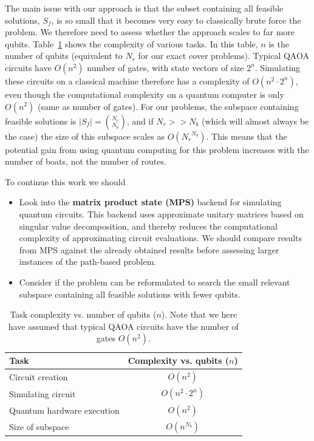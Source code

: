 \documentclass{article}
\begin{document}
The main issue with our approach is that the subset containing all feasible solutions, $S_f$, is so small that it becomes very easy to classically brute force the problem. We therefore need to assess whether the approach scales to far more qubits. 
Table~\ref{tab:task_complexity} shows the complexity of various tasks.
In this table, $n$ is the number of qubits (equivalent to $N_r$ for our exact cover problems). Typical QAOA circuits have $O(n^2)$ number of gates, with state vectors of size $2^n$. Simulating these circuits on a classical machine therefore has a complexity of $O(n^2 \cdot 2^n)$, even though the computational complexity on a quantum computer is only $O(n^2)$ (same as number of gates). For our problems, the subspace containing feasible solutions is $|S_f| = \binom{N_r}{N_b}$, and if $N_r >> N_b$ (which will almost always be the case) the size of this subspace scales as $O({N_r}^{N_b})$. This means that the potential gain from using quantum computing for this problem increases with the number of boats, not the number of routes.

To continue this work we should
\begin{itemize}
    \item Look into the \textbf{matrix product state (MPS)} backend for simulating quantum circuits. This backend uses approximate unitary matrices based on singular value decomposition, and thereby reduces the computational complexity of approximating circuit evaluations. We should compare results from MPS against the already obtained results before assessing larger instances of the path-based problem.
    \item Consider if the problem can be reformulated to search the small relevant subspace containing all feasible solutions with fewer qubits.
\end{itemize}


\begin{table}
    \centering
    \begin{tabular}{>{\raggedright}p{5cm} c}
    \toprule
    \textbf{Task} & \textbf{Complexity vs. qubits ($n$)} \\
    \midrule
    Circuit creation & $O(n^2)$ \\
    Simulating circuit & $O(n^2 \cdot 2^n)$ \\
    Quantum hardware execution & $O(n^2)$ \\
    Size of subspace & $O(n^{N_b})$ \\
    \bottomrule
    \end{tabular}
    \caption{Task complexity vs. number of qubits ($n$). Note that we here have assumed that typical QAOA circuits have the number of gates $O(n^2)$.}
    \label{tab:task_complexity}
\end{table}
\end{document}
